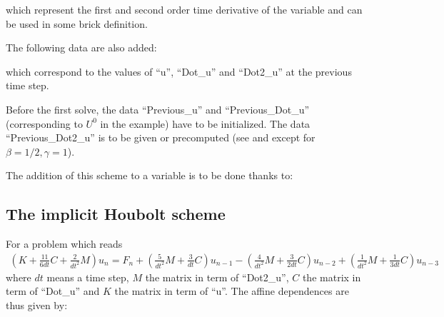 \documentclass[a4paper,11pt,english]{sphinxmanual}
\begin{document}
which represent the first and second order time derivative of the variable and can be used in some brick definition.

The following data are also added:

\begin{sphinxVerbatim}[commandchars=\\\{\}]
  
\end{sphinxVerbatim}

which correspond to the values of “u”, “Dot\_u”  and “Dot2\_u” at the previous time step.

Before the first solve, the data  “Previous\_u” and “Previous\_Dot\_u” (corresponding to \(U^0\) in the example) have to be initialized. The data “Previous\_Dot2\_u” is to be given or precomputed (see {\hyperref[\detokenize{userdoc/model_time_integration:precomp-time-der-section}]{}} and except for \(\beta = 1/2, \gamma = 1\)).

The addition of this scheme to a variable is to be done thanks to:

\begin{sphinxVerbatim}[commandchars=\\\{\}]
    
                      
\end{sphinxVerbatim}


\subsection{The implicit Houbolt scheme}
\label{\detokenize{userdoc/model_time_integration:the-implicit-houbolt-scheme}}
For a problem which reads
\begin{equation*}
\begin{split}(K+\frac{11}{6 dt}C+\frac{2}{dt^2}M) u_{n} = F_{n} + (\frac{5}{dt^2} M + \frac{3}{  dt} C) u_{n-1}
                                                   - (\frac{4}{dt^2} M + \frac{3}{2 dt} C) u_{n-2}
                                                   + (\frac{1}{dt^2} M + \frac{1}{3 dt} C) u_{n-3}\end{split}
\end{equation*}
where \(dt\) means a time step, \(M\) the matrix in term of “Dot2\_u”, \(C\) the matrix in term of “Dot\_u” and \(K\) the matrix in term of “u”.
The affine dependences are thus given by:
\end{document}
